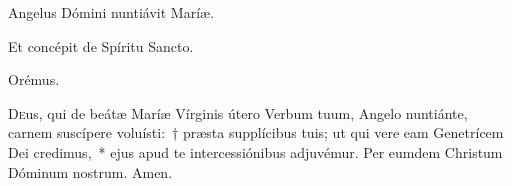 
\vv Angelus Dómini nuntiávit Maríæ.

\rr Et concépit de Spíritu Sancto.

Orémus.

\lettrine{D}{e}us, qui de beátæ Maríæ Vírginis útero Verbum tuum, Angelo nuntiánte, carnem suscípere voluísti:~† præsta supplícibus tuis; ut qui vere eam Genetrícem Dei credimus,~* ejus apud te intercessiónibus adjuvémur. Per eumdem Christum Dóminum nostrum. \rr Amen.